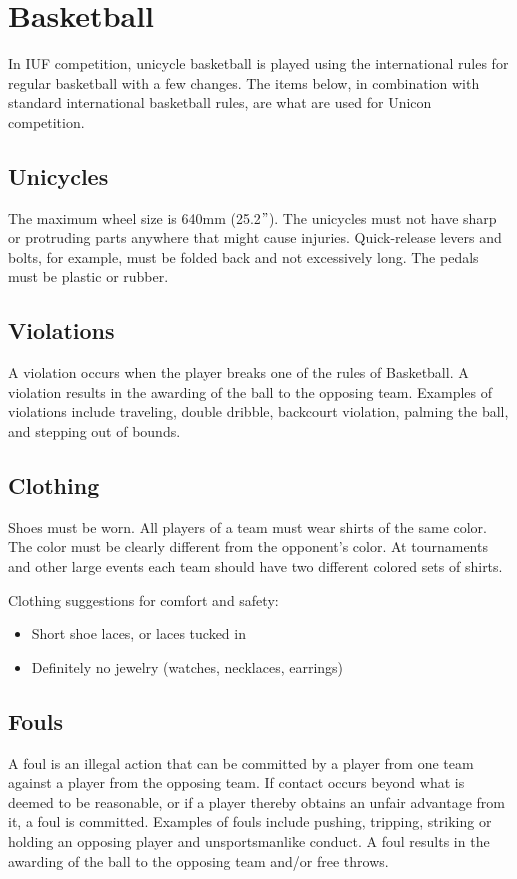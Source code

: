\chapter*{Basketball \label{chap:basketball}}

In IUF competition, unicycle basketball is played using the international rules for regular basketball with a few changes.
The items below, in combination with standard international basketball rules, are what are used for Unicon competition.

\section{Unicycles}
The maximum wheel size is 640mm (25.2$"$).
The unicycles must not have sharp or protruding parts anywhere that might
cause injuries.
Quick-release levers and bolts, for example, must be folded back and not excessively long.
The pedals must be plastic or rubber.

\section{Violations}
A violation occurs when the player breaks one of the rules of Basketball.
A violation results in the awarding of the ball to the opposing team.
Examples of violations include traveling, double dribble, backcourt violation, palming the ball, and stepping out of bounds.

\section{Clothing}
Shoes must be worn.
All players of a team must wear shirts of the same color.
The color must be clearly different from the opponent's color.
At tournaments and other large events each team should have two different colored sets of shirts.

Clothing suggestions for comfort and safety:
\begin{itemize}
\item Short shoe laces, or laces tucked in
\item Definitely no jewelry (watches, necklaces, earrings)
\end{itemize}

\section{Fouls}
A foul is an illegal action that can be committed by a player from one team against a player from the opposing team.
If contact occurs beyond what is deemed to be reasonable, or if a player thereby obtains an unfair advantage from it, a foul is committed.
Examples of fouls include pushing, tripping, striking or holding an opposing player and unsportsmanlike conduct.
A foul results in the awarding of the ball to the opposing team and/or free throws.

